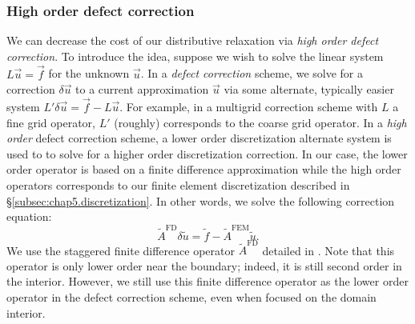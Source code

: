 \subsubsection{High order defect correction} \label{subsubsec:chap5.multigrid.relaxation.defectcorrection}

We can decrease the cost of our distributive relaxation via \emph{high order defect correction}. To introduce the idea, suppose we wish to solve the linear system $L \vec{u} = \vec{f}$ for the unknown $\vec{u}$. In a \emph{defect correction} scheme, we solve for a correction $\delta\vec{u}$ to a current approximation $\vec{u}$ via some alternate, typically easier system $L' \delta\vec{u} = \vec{f} - L \vec{u}$. For example, in a multigrid correction scheme with $L$ a fine grid operator, $L'$ (roughly) corresponds to the coarse grid operator. In a \emph{high order} defect correction scheme, a lower order discretization alternate system is used to to solve for a higher order discretization correction. In our case, the lower order operator is based on a finite difference approximation while the high order operators corresponds to our finite element discretization described in \S\ref{subsec:chap5.discretization}. In other words, we solve the following correction equation:
\begin{equation*}
\tilde{A}^{\text{FD}} \delta\tilde{u} = \tilde{f} - \tilde{A}^{\text{FEM}} \tilde{u}.
\end{equation*}
We use the staggered finite difference operator $\tilde{A}^{\text{FD}}$ detailed in \cite{Zhu.Yongning10}. Note that this operator is only lower order near the boundary; indeed, it is still second order in the interior. However, we still use this finite difference operator as the lower order operator in the defect correction scheme, even when focused on the domain interior.

